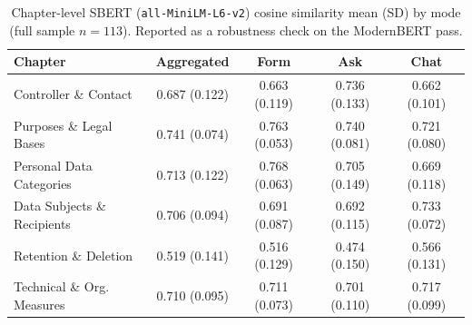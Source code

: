 \begin{table}[htbp]
\centering
\caption{Chapter-level SBERT (\texttt{all-MiniLM-L6-v2}) cosine
similarity mean (SD) by mode (full sample $n = 113$). Reported as
a robustness check on the ModernBERT pass.}
\label{tab:nlp-chapter-sbert-minilm}
\small
\begin{tabular}{@{}l c c c c@{}}
\toprule
Chapter & Aggregated & Form & Ask & Chat \\
\midrule
Controller \& Contact         & 0.687 (0.122) & 0.663 (0.119) & 0.736 (0.133) & 0.662 (0.101) \\
Purposes \& Legal Bases       & 0.741 (0.074) & 0.763 (0.053) & 0.740 (0.081) & 0.721 (0.080) \\
Personal Data Categories      & 0.713 (0.122) & 0.768 (0.063) & 0.705 (0.149) & 0.669 (0.118) \\
Data Subjects \& Recipients   & 0.706 (0.094) & 0.691 (0.087) & 0.692 (0.115) & 0.733 (0.072) \\
Retention \& Deletion         & 0.519 (0.141) & 0.516 (0.129) & 0.474 (0.150) & 0.566 (0.131) \\
Technical \& Org. Measures    & 0.710 (0.095) & 0.711 (0.073) & 0.701 (0.110) & 0.717 (0.099) \\
\bottomrule
\end{tabular}
\end{table}
